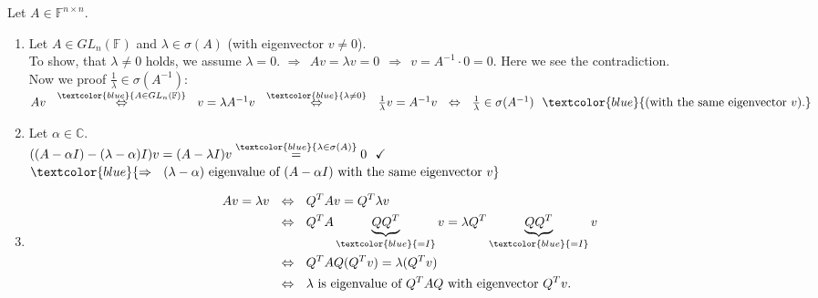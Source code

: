 {\color{solution}
Let $A\in\mathbb{F}^{n\times n}$.
\begin{enumerate}
	\item 
	Let $A\in GL_n(\mathbb{F})$ and $\lambda\in\sigma(A)$ (with eigenvector $v\neq 0$).\\
	To show, that $\lambda\neq 0$ holds, we assume $\lambda = 0$.
	$\Rightarrow~~Av=\lambda v=0~~\Rightarrow~~v=A^{-1}\cdot 0=0$. 
	Here we see the contradiction.\\
	Now we proof $\frac{1}{\lambda}\in\sigma(A^{-1})$:\\
	$Av~~\stackrel{\textcolor{blue}{A\in GL_n(\mathbb{F})}}{\Leftrightarrow}~~ v = \lambda A^{-1}v~~\stackrel{\textcolor{blue}{\lambda\neq 0}}{\Leftrightarrow}~~\frac{1}{\lambda}v=A^{-1}v~~\Leftrightarrow~~\frac{1}{\lambda}\in\sigma(A^{-1})~~\textcolor{blue}{(\text{with the same eigenvector}~v).}$
	\item 
	Let $\alpha\in\mathbb{C}$.\\$((A-\alpha I)-(\lambda -\alpha)I)v=(A-\lambda I)v\stackrel{\textcolor{blue}{\lambda\in\sigma(A)}}{=}0~~\checkmark$\\$\textcolor{blue}{\Rightarrow~~(\lambda-\alpha)~\text{eigenvalue of}~(A-\alpha I)~\text{with the same eigenvector}~v}$
	\item 
	\begin{align*} 
	Av=\lambda v~~&\Leftrightarrow~~Q^TAv=Q^T\lambda v\\
	&\Leftrightarrow~~Q^TA\underbrace{QQ^T}_{\textcolor{blue}{=I}}v=\lambda Q^T \underbrace{QQ^T}_{\textcolor{blue}{=I}}v\\
	&\Leftrightarrow~~Q^TAQ(Q^Tv)=\lambda(Q^Tv)\\
	&\Leftrightarrow~~\lambda~\text{is eigenvalue of}~Q^TAQ~\text{with eigenvector}~Q^Tv.
	\end{align*}
\end{enumerate}
}